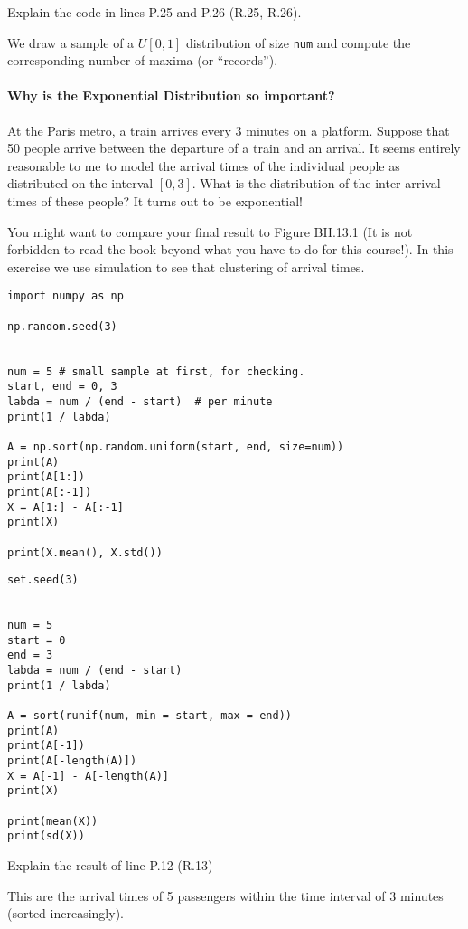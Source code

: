 \documentclass[assignments]{subfiles}
\begin{document}
\begin{exercise}
Explain the code in lines P.25 and P.26 (R.25, R.26).
\begin{solution}
We draw a sample of a $U[0,1]$ distribution of size \verb|num| and compute the corresponding number of maxima (or ``records'').
\end{solution}
\end{exercise}

\paragraph{Why is the Exponential Distribution so important?}

At the Paris metro, a train arrives every 3 minutes on a platform.
Suppose that 50 people arrive between the departure of a train and an arrival.
It seems entirely reasonable to me to model the arrival times of the individual people as distributed on the interval \([0,3]\).
What is the distribution of the inter-arrival times of these people?
It turns out to be exponential!

You might want to compare your final result to Figure BH.13.1 (It is not forbidden to read the book beyond what you have to do for this course!).
In this exercise we use simulation to see that clustering of arrival times.


\begin{verbatim}
import numpy as np

np.random.seed(3)


num = 5 # small sample at first, for checking.
start, end = 0, 3
labda = num / (end - start)  # per minute
print(1 / labda)

A = np.sort(np.random.uniform(start, end, size=num))
print(A)
print(A[1:])
print(A[:-1])
X = A[1:] - A[:-1]
print(X)

print(X.mean(), X.std())
\end{verbatim}


\begin{verbatim}
set.seed(3)


num = 5
start = 0
end = 3
labda = num / (end - start)
print(1 / labda)

A = sort(runif(num, min = start, max = end))
print(A)
print(A[-1])
print(A[-length(A)])
X = A[-1] - A[-length(A)]
print(X)

print(mean(X))
print(sd(X))
\end{verbatim}

\begin{exercise}
Explain the result of line P.12 (R.13)
\begin{solution}
This are the arrival times of 5 passengers within the time interval of 3 minutes (sorted increasingly).
\end{solution}
\end{exercise}
\end{document}
